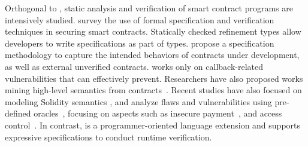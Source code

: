 Orthogonal to \lang, static analysis and verification of smart contract programs are intensively studied.
\citet{DBLP:journals/csur/TolmachLLLL22} survey the use of formal specification and verification techniques
in securing smart contracts.
Statically checked refinement types \cite{coblenzObsidianSaferBlockchain2017,DBLP:journals/pacmpl/TanMLDF22}
allow developers to write specifications as part of types.
\citet{DBLP:journals/pacmpl/BramEMSS21} propose a specification methodology to 
capture the intended behaviors of contracts under development, as well as external 
unverified contracts.
\cite{DBLP:journals/pacmpl/GrossmanAGMRSZ18} works only on callback-related vulnerabilities that \lang can effectively prevent.
Researchers have also proposed works mining high-level semantics from contracts~\cite{liu2022finding,liu2022invcon}.
Recent studies have also focused on modeling Solidity semantics
\cite{DBLP:conf/sp/JiaoK0S0020, Sergey2021, DBLP:conf/esorics/BartolettiGM19, DBLP:conf/fc/CrafaPZ19}, and analyze flaws and vulnerabilities using pre-defined oracles~\cite{DBLP:journals/pacmpl/SmaragdakisGLTT21,DBLP:journals/pacmpl/GrechKJBSS18, DBLP:conf/pldi/Pirlea0S21, ghaleb2022etainter,liao2023smartstate, DBLP:journals/pacmpl/AlbertGRRRS20, DBLP:conf/pldi/BrentGLSS20}, focusing on aspects such as insecure payment~\cite{DBLP:journals/pacmpl/WangZS19}, 
and access control~\cite{ghaleb2023achecker}.
In contrast, \lang is a programmer-oriented language extension and supports expressive specifications to conduct runtime verification.









